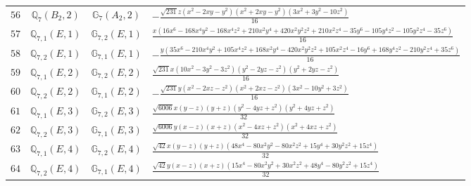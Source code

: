 \documentclass[fleqn,8pt,landscape]{jsarticle}
\begin{document}
\begin{table}[ht!]
\begin{center}
\begin{tabular}{cccl}
$ 56 $ & $ \mathbb{Q}_{7}(B_{2},2) $ & $ \mathbb{G}_{7}(A_{2},2) $ & $ - \frac{\sqrt{231} z \left(x^{2} - 2 x y - y^{2}\right) \left(x^{2} + 2 x y - y^{2}\right) \left(3 x^{2} + 3 y^{2} - 10 z^{2}\right)}{16} $ \\
$ 57 $ & $ \mathbb{Q}_{7,1}(E,1) $ & $ \mathbb{G}_{7,2}(E,1) $ & $ \frac{x \left(16 x^{6} - 168 x^{4} y^{2} - 168 x^{4} z^{2} + 210 x^{2} y^{4} + 420 x^{2} y^{2} z^{2} + 210 x^{2} z^{4} - 35 y^{6} - 105 y^{4} z^{2} - 105 y^{2} z^{4} - 35 z^{6}\right)}{16} $ \\
$ 58 $ & $ \mathbb{Q}_{7,2}(E,1) $ & $ \mathbb{G}_{7,1}(E,1) $ & $ - \frac{y \left(35 x^{6} - 210 x^{4} y^{2} + 105 x^{4} z^{2} + 168 x^{2} y^{4} - 420 x^{2} y^{2} z^{2} + 105 x^{2} z^{4} - 16 y^{6} + 168 y^{4} z^{2} - 210 y^{2} z^{4} + 35 z^{6}\right)}{16} $ \\
$ 59 $ & $ \mathbb{Q}_{7,1}(E,2) $ & $ \mathbb{G}_{7,2}(E,2) $ & $ \frac{\sqrt{231} x \left(10 x^{2} - 3 y^{2} - 3 z^{2}\right) \left(y^{2} - 2 y z - z^{2}\right) \left(y^{2} + 2 y z - z^{2}\right)}{16} $ \\
$ 60 $ & $ \mathbb{Q}_{7,2}(E,2) $ & $ \mathbb{G}_{7,1}(E,2) $ & $ - \frac{\sqrt{231} y \left(x^{2} - 2 x z - z^{2}\right) \left(x^{2} + 2 x z - z^{2}\right) \left(3 x^{2} - 10 y^{2} + 3 z^{2}\right)}{16} $ \\
$ 61 $ & $ \mathbb{Q}_{7,1}(E,3) $ & $ \mathbb{G}_{7,2}(E,3) $ & $ \frac{\sqrt{6006} x \left(y - z\right) \left(y + z\right) \left(y^{2} - 4 y z + z^{2}\right) \left(y^{2} + 4 y z + z^{2}\right)}{32} $ \\
$ 62 $ & $ \mathbb{Q}_{7,2}(E,3) $ & $ \mathbb{G}_{7,1}(E,3) $ & $ \frac{\sqrt{6006} y \left(x - z\right) \left(x + z\right) \left(x^{2} - 4 x z + z^{2}\right) \left(x^{2} + 4 x z + z^{2}\right)}{32} $ \\
$ 63 $ & $ \mathbb{Q}_{7,1}(E,4) $ & $ \mathbb{G}_{7,2}(E,4) $ & $ \frac{\sqrt{42} x \left(y - z\right) \left(y + z\right) \left(48 x^{4} - 80 x^{2} y^{2} - 80 x^{2} z^{2} + 15 y^{4} + 30 y^{2} z^{2} + 15 z^{4}\right)}{32} $ \\
$ 64 $ & $ \mathbb{Q}_{7,2}(E,4) $ & $ \mathbb{G}_{7,1}(E,4) $ & $ \frac{\sqrt{42} y \left(x - z\right) \left(x + z\right) \left(15 x^{4} - 80 x^{2} y^{2} + 30 x^{2} z^{2} + 48 y^{4} - 80 y^{2} z^{2} + 15 z^{4}\right)}{32} $ \\
 \hline \hline
\end{tabular}
\end{center}
\end{table}
\end{document}
